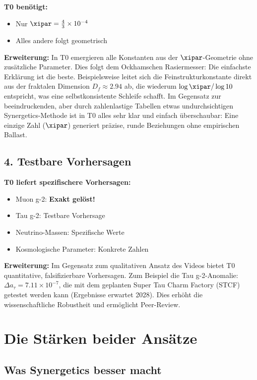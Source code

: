 	\textbf{T0 benötigt:}
	\begin{itemize}
		\item Nur $\xipar = \frac{4}{3} \times 10^{-4}$
		\item Alles andere folgt geometrisch
	\end{itemize}
	
	\textbf{Erweiterung:} In T0 emergieren alle Konstanten aus der $\xipar$-Geometrie ohne zusätzliche Parameter. Dies folgt dem Ockhamschen Rasiermesser: Die einfachste Erklärung ist die beste. Beispielsweise leitet sich die Feinstrukturkonstante direkt aus der fraktalen Dimension $D_f \approx 2.94$ ab, die wiederum $\log \xipar / \log 10$ entspricht, was eine selbstkonsistente Schleife schafft. Im Gegensatz zur beeindruckenden, aber durch zahlenlastige Tabellen etwas undurchsichtigen Synergetics-Methode ist in T0 alles sehr klar und einfach überschaubar: Eine einzige Zahl ($\xipar$) generiert präzise, runde Beziehungen ohne empirischen Ballast.
	
	\subsection{4. Testbare Vorhersagen}
	
	\begin{vorteil}
		\textbf{T0 liefert spezifischere Vorhersagen:}
		\begin{itemize}
			\item Muon g-2: \textbf{Exakt gelöst!}
			\item Tau g-2: Testbare Vorhersage
			\item Neutrino-Massen: Spezifische Werte
			\item Kosmologische Parameter: Konkrete Zahlen
		\end{itemize}
		
		\textbf{Erweiterung:} Im Gegensatz zum qualitativen Ansatz des Videos bietet T0 quantitative, falsifizierbare Vorhersagen. Zum Beispiel die Tau g-2-Anomalie: $\Delta a_\tau = 7.11 \times 10^{-7}$, die mit dem geplanten Super Tau Charm Factory (STCF) getestet werden kann (Ergebnisse erwartet 2028). Dies erhöht die wissenschaftliche Robustheit und ermöglicht Peer-Review.
	\end{vorteil}
	
	\section{Die Stärken beider Ansätze}
	
	\subsection{Was Synergetics besser macht}
	
